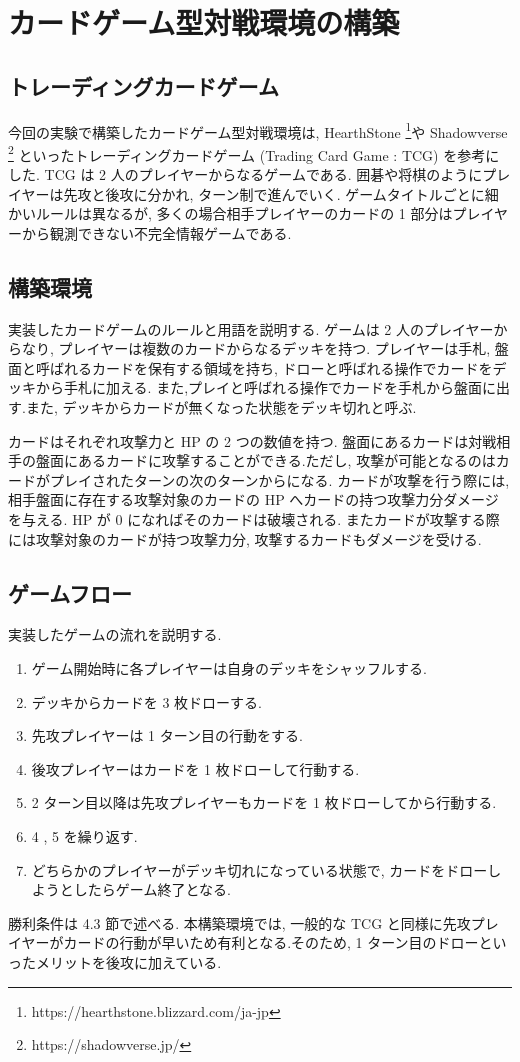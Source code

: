\documentclass[twocolumn]{jarticle}
\begin{document}
\section{カードゲーム型対戦環境の構築}
\subsection{トレーディングカードゲーム}
今回の実験で構築したカードゲーム型対戦環境は, HearthStone \footnote[1]{https://hearthstone.blizzard.com/ja-jp}や Shadowverse \footnote[2]{https://shadowverse.jp/} といったトレーディングカードゲーム (Trading Card Game : TCG) を参考にした. TCG は 2 人のプレイヤーからなるゲームである. 囲碁や将棋のようにプレイヤーは先攻と後攻に分かれ, ターン制で進んでいく. 
ゲームタイトルごとに細かいルールは異なるが, 多くの場合相手プレイヤーのカードの 1 部分はプレイヤーから観測できない不完全情報ゲームである.

\subsection{構築環境}
実装したカードゲームのルールと用語を説明する.
ゲームは 2 人のプレイヤーからなり, プレイヤーは複数のカードからなるデッキを持つ.
プレイヤーは手札, 盤面と呼ばれるカードを保有する領域を持ち, ドローと呼ばれる操作でカードをデッキから手札に加える. また,プレイと呼ばれる操作でカードを手札から盤面に出す.また, デッキからカードが無くなった状態をデッキ切れと呼ぶ.
\par
カードはそれぞれ攻撃力と HP の 2 つの数値を持つ. 盤面にあるカードは対戦相手の盤面にあるカードに攻撃することができる.ただし, 攻撃が可能となるのはカードがプレイされたターンの次のターンからになる. カードが攻撃を行う際には, 相手盤面に存在する攻撃対象のカードの HP へカードの持つ攻撃力分ダメージを与える. HP が 0 になればそのカードは破壊される. またカードが攻撃する際には攻撃対象のカードが持つ攻撃力分, 攻撃するカードもダメージを受ける.

\subsection{ゲームフロー}
実装したゲームの流れを説明する.
\begin{enumerate}
  \setlength{\itemsep}{0cm} %
  \item ゲーム開始時に各プレイヤーは自身のデッキをシャッフルする.
  \item デッキからカードを 3 枚ドローする.
  \item 先攻プレイヤーは 1 ターン目の行動をする.
  \item 後攻プレイヤーはカードを 1 枚ドローして行動する.
  \item 2 ターン目以降は先攻プレイヤーもカードを 1 枚ドローしてから行動する.
  \item 4 , 5 を繰り返す.
  \item どちらかのプレイヤーがデッキ切れになっている状態で, カードをドローしようとしたらゲーム終了となる.
\end{enumerate}
勝利条件は 4.3 節で述べる.
本構築環境では, 一般的な TCG と同様に先攻プレイヤーがカードの行動が早いため有利となる.そのため, 1 ターン目のドローといったメリットを後攻に加えている. 
\end{document}
